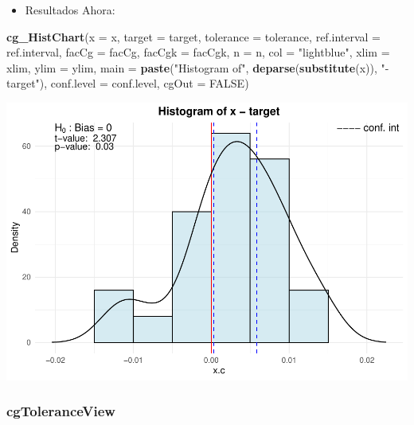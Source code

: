 \documentclass[
]{book}
\newenvironment{Shaded}{\begin{snugshade}}{\end{snugshade}}
\newcommand{\AttributeTok}[1]{\textcolor[rgb]{0.13,0.29,0.53}{#1}}
\newcommand{\ConstantTok}[1]{\textcolor[rgb]{0.56,0.35,0.01}{#1}}
\newcommand{\FunctionTok}[1]{\textcolor[rgb]{0.13,0.29,0.53}{\textbf{#1}}}
\newcommand{\NormalTok}[1]{#1}
\newcommand{\StringTok}[1]{\textcolor[rgb]{0.31,0.60,0.02}{#1}}
\providecommand{\tightlist}{%
  \setlength{\itemsep}{0pt}\setlength{\parskip}{0pt}}
\begin{document}
\begin{itemize}
\tightlist
\item
  Resultados Ahora:
\end{itemize}

\begin{Shaded}
\begin{Highlighting}[]
\FunctionTok{cg\_HistChart}\NormalTok{(}\AttributeTok{x =}\NormalTok{ x, }\AttributeTok{target =}\NormalTok{ target, }\AttributeTok{tolerance =}\NormalTok{ tolerance, }\AttributeTok{ref.interval =}\NormalTok{ ref.interval, }
            \AttributeTok{facCg =}\NormalTok{ facCg, }\AttributeTok{facCgk =}\NormalTok{ facCgk, }\AttributeTok{n =}\NormalTok{ n, }\AttributeTok{col =} \StringTok{"lightblue"}\NormalTok{, }
            \AttributeTok{xlim =}\NormalTok{ xlim, }\AttributeTok{ylim =}\NormalTok{ ylim, }\AttributeTok{main =} \FunctionTok{paste}\NormalTok{(}\StringTok{"Histogram of"}\NormalTok{, }
                                                   \FunctionTok{deparse}\NormalTok{(}\FunctionTok{substitute}\NormalTok{(x)), }\StringTok{"{-} target"}\NormalTok{),}
            \AttributeTok{conf.level =}\NormalTok{ conf.level, }\AttributeTok{cgOut =} \ConstantTok{FALSE}\NormalTok{)}
\end{Highlighting}
\end{Shaded}

\includegraphics{Libro_TidyQualityTools_files/figure-latex/unnamed-chunk-148-1.pdf}

\hypertarget{cgtoleranceview}{%
\subsubsection{cgToleranceView}\label{cgtoleranceview}}
\end{document}
